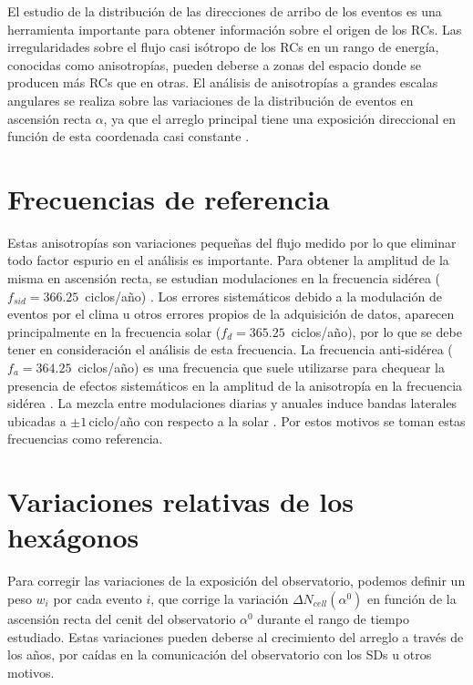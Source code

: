 El estudio de la distribución de las direcciones de arribo de los eventos es una herramienta importante para obtener información sobre el origen de los RCs. Las irregularidades sobre el flujo casi isótropo de los RCs en un rango de energía, conocidas como anisotropías, pueden deberse a zonas del espacio donde se producen más RCs que en otras. El análisis de anisotropías a grandes escalas angulares se realiza sobre las variaciones de la distribución de eventos en ascensión recta $\alpha$, ya que el arreglo principal tiene una exposición direccional en función de esta coordenada casi constante \cite{referencia_anis}.

\section{Frecuencias de referencia}

Estas anisotropías son variaciones pequeñas del flujo medido por lo que eliminar todo factor espurio en el análisis es importante. Para obtener la amplitud de la misma en ascensión recta, se estudian modulaciones en la frecuencia sidérea ($f_{sid}=366.25\,$ ciclos/año) \cite{taborda}. Los errores sistemáticos debido a la modulación de eventos por el clima u otros errores propios de la adquisición de datos, aparecen principalmente en la frecuencia solar  ($f_{d}=365.25\,$ ciclos/año), por lo que se debe tener en consideración el análisis de esta frecuencia. La frecuencia anti-sidérea ($f_a=364.25\,$ ciclos/año) es una frecuencia que suele utilizarse para chequear la presencia de efectos sistemáticos en la amplitud de la anisotropía en la frecuencia sidérea \cite{farley1954sidereal}. La mezcla entre modulaciones diarias y anuales induce bandas laterales ubicadas a $\pm1\,$ciclo/año con respecto a la solar \cite{taborda}. Por estos motivos se toman estas frecuencias  como referencia.

\section{Variaciones relativas de los hexágonos} \label{peso_hexagonos}

Para corregir las variaciones de la exposición del observatorio, podemos definir un peso  $w_i$ por cada evento $i$, que corrige la variación  $\Delta N_{cell}(\alpha^0)$ en función de la ascensión recta del cenit del observatorio $\alpha^0$ durante el rango de tiempo estudiado. Estas variaciones pueden deberse al crecimiento del arreglo a través de los años,  por caídas en la comunicación del observatorio con los SDs u otros motivos. 

